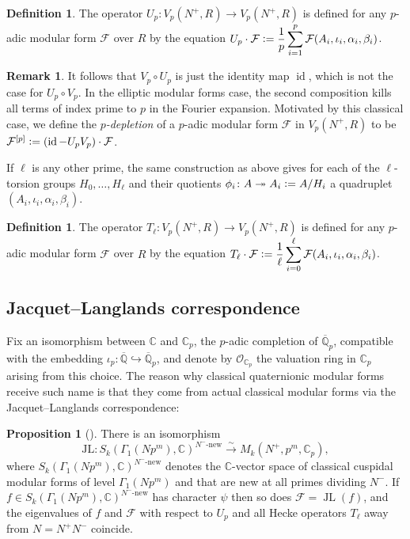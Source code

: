 \documentclass[a4paper]{amsart}
\numberwithin{equation}{section}
\theoremstyle{definition}
\newtheorem{proposition}[theorem]{Proposition}
\newtheorem{definition}[theorem]{Definition}
\newtheorem{remark}[theorem]{Remark}
\newcommand{\Q}{\mathbb{Q}}
\newcommand{\C}{\mathbb{C}}
\newcommand{\defeq}{\vcentcolon=}
\DeclareMathOperator{\id}{id}
\begin{document}
\begin{definition}
The operator $U_p\colon V_p(N^+,R) \rightarrow V_p(N^+,R)$ is defined for any $p$-adic modular form $\mathcal{F}$ over $R$ by the equation $\displaystyle U_p\cdot\mathcal{F}\defeq\frac{1}{p} \sum_{i=1}^p\mathcal{F}(A_i,\iota_i,\alpha_i,\beta_{i})$.
\end{definition}

\begin{remark}
It follows that $V_p\circ U_p$ is just the identity map $\id$, which is not the case for $U_p\circ V_p$. In the elliptic modular forms case, the second composition kills all terms of index prime to $p$ in the Fourier expansion. Motivated by this classical case, we define the \emph{$p$-depletion} of a $p$-adic modular form $\mathcal{F}$ in $V_p(N^+,R)$ to be
$\mathcal{F}^{[p]} \defeq (\id - U_pV_p)\cdot \mathcal{F}$.
\end{remark}

If $\ell$ is any other prime, the same construction as above gives for each of the $\ell$-torsion groups $H_0,\dots,H_\ell$ and their quotients $\phi_i\colon A\twoheadrightarrow A_i\defeq A/H_i$ a quadruplet $(A_i,\iota_i,\alpha_i,\beta_i)$.

\begin{definition}
The operator $T_\ell\colon V_p(N^+,R) \rightarrow V_p(N^+,R)$ is defined for any $p$-adic modular form $\mathcal{F}$ over $R$ by the equation $\displaystyle T_\ell\cdot \mathcal{F}\defeq\frac{1}{\ell} \sum_{i=0}^\ell\mathcal{F}(A_i,\iota_i,\alpha_i,\beta_{i})$.
\end{definition}

\subsection{Jacquet--Langlands correspondence}

Fix an isomorphism between $\C$ and $\C_p$, the $p$-adic completion of $\overline{\Q}_p$, compatible with the embedding $\iota_p\colon\overline{\Q}\hookrightarrow\overline{\Q}_p$, and denote by $\mathcal{O}_{\C_p}$ the valuation ring in $\C_p$ arising from this choice. The reason why classical quaternionic modular forms receive such name is that they come from actual classical modular forms via the Jacquet--Langlands correspondence:

\begin{proposition}[{\cite[Theorem 16.1]{JacquetLanglands}}]\label{prop.JacquetLanglands}
There is an isomorphism \[\mathrm{JL}\colon S_k(\Gamma_1(Np^m),\C)^{N^{-}\text{-new}}\stackrel{\sim}{\longrightarrow}M_k(N^+,p^m,\C_p),\] where $S_k(\Gamma_1(Np^m),\C)^{N^{-}\text{-new}}$ denotes the $\C$-vector space of classical cuspidal modular forms of level $\Gamma_1(Np^m)$ and that are new at all primes dividing $N^-$. If $f\in S_k(\Gamma_1(Np^m),\C)^{N^{-}\text{-new}}$ has character $\psi$ then so does $\mathcal{F}=\operatorname{JL}(f)$, and the eigenvalues of $f$ and $\mathcal{F}$ with respect to $U_p$ and all Hecke operators $T_\ell$ away from $N=N^+N^-$ coincide.
\end{proposition}
\end{document}
